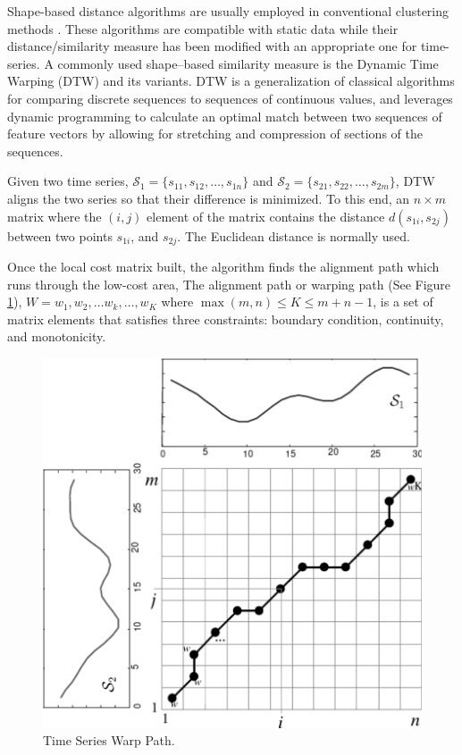 Shape-based distance algorithms are usually employed in conventional clustering methods \cite{Pal2017}. These algorithms  are compatible with static data while their distance/similarity measure has been modified with an appropriate one for time-series. A commonly used shape--based similarity measure is the Dynamic Time Warping (DTW) \cite{Sakoe1978} and its variants. DTW is a generalization of classical algorithms for comparing discrete sequences to sequences of continuous values, and leverages dynamic programming to calculate an optimal match between two sequences of feature vectors by allowing for stretching and compression of sections of the sequences. 

Given two time series, $\mathcal{S}_{1} =\{s_{11}, s_{12}, \ldots, s_{1n}\}$ and $\mathcal{S}_{2} = \{s_{21}, s_{22}, \ldots, s_{2m}\}$, DTW aligns the two series so that their difference is minimized. To this end, an $n \times m$ matrix where the $(i, j)$ element of the matrix contains the distance $d(s_{1i}, s_{2j})$ between two points $s_{1i}$, and $s_{2j}$. The Euclidean distance is normally used. 

Once the local cost matrix built, the algorithm finds the alignment path which runs through the low-cost area, The alignment path or warping path (See Figure \ref{Fig:DTW_warp_path}), $W = w_{1} , w_{2}, \ldots w_{k}, \ldots, w_{K}$ where $\max(m, n) \leq K \leq m + n-1$, is a set of matrix elements that satisfies three constraints: boundary condition, continuity, and monotonicity. 

\begin{figure}[htb]
	\centering
	\includegraphics[scale=0.5]{../Figures/DTW-WarpPath}
	\caption{Time Series Warp Path.}
	\label{Fig:DTW_warp_path}
\end{figure}

